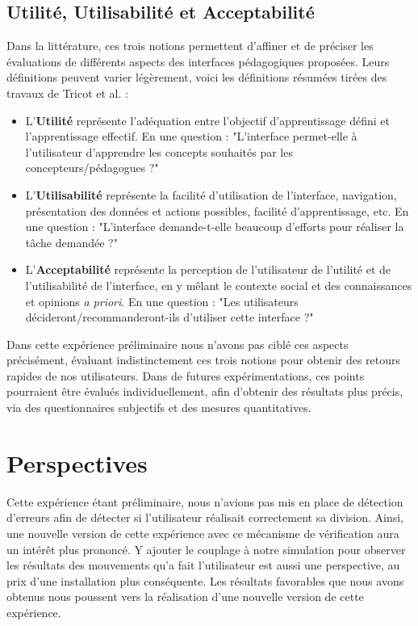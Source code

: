 		\subsection{Utilité, Utilisabilité et Acceptabilité}
		Dans la littérature, ces trois notions permettent d'affiner et de préciser les évaluations de différents aspects des interfaces pédagogiques proposées. Leurs définitions peuvent varier légèrement, voici les définitions résumées tirées des travaux de Tricot et al. \cite{tricot_utilite_2003} :
		\begin{itemize}
			\item L'\textbf{Utilité} représente l'adéquation entre l'objectif d'apprentissage défini et l'apprentissage effectif. En une question : "L'interface permet-elle à l'utilisateur d'apprendre les concepts souhaités par les concepteurs/pédagogues ?"
			\item L'\textbf{Utilisabilité} représente la facilité d'utilisation de l'interface, navigation, présentation des données et actions possibles, facilité d'apprentissage, etc. En une question : "L'interface demande-t-elle beaucoup d'efforts pour réaliser la tâche demandée ?"
			\item L'\textbf{Acceptabilité} représente la perception de l'utilisateur de l'utilité et de l'utilisabilité de l'interface, en y mêlant le contexte social et des connaissances et opinions \textit{a priori}. En une question : "Les utilisateurs décideront/recommanderont-ils d'utiliser cette interface ?"
		\end{itemize}
		
		Dans cette expérience préliminaire nous n'avons pas ciblé ces aspects précisément, évaluant indistinctement ces trois notions pour obtenir des retours rapides de nos utilisateurs. Dans de futures expérimentations, ces points pourraient être évalués individuellement, afin d'obtenir des résultats plus précis, via des questionnaires subjectifs et des mesures quantitatives.
	
	\section{Perspectives}
 	Cette expérience étant préliminaire, nous n'avions pas mis en place de détection d'erreurs afin de détecter si l'utilisateur réalisait correctement sa division. Ainsi, une nouvelle version de cette expérience avec ce mécanisme de vérification aura un intérêt plus prononcé. Y ajouter le couplage à notre simulation pour observer les résultats des mouvements qu'a fait l'utilisateur est aussi une perspective, au prix d'une installation plus conséquente. Les résultats favorables que nous avons obtenus nous poussent vers la réalisation d'une nouvelle version de cette expérience.
	
